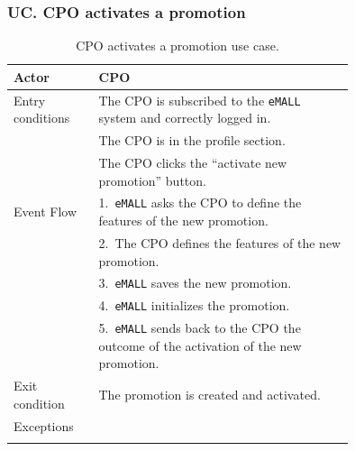\subsubsection*{UC\cuc . CPO activates a promotion}
\begin{center}
    \begin{longtable}{lp{0.75\linewidth}}
        \hline
        Actor            & CPO                                                                                        \\
        \hline
        Entry conditions & The CPO is subscribed to the \verb|eMALL| system and correctly logged in.                  \\
        & The CPO is in the profile section.                                                         \\
        & The CPO clicks the “activate new promotion” button.                                        \\
        \hline
        Event Flow       & 1.\ \verb|eMALL| asks the CPO to define the features of the new promotion.                 \\
        & 2.\ The CPO defines the features of the new promotion.                                     \\
        & 3.\ \verb|eMALL| saves the new promotion.                                                  \\
        & 4.\ \verb|eMALL| initializes the promotion.                                                \\
        & 5.\ \verb|eMALL| sends back to the CPO the outcome of the activation of the new promotion. \\
        \hline
        Exit condition   & The promotion is created and activated.                                                    \\
        \hline
        Exceptions       &                                                                                            \\
        \hline
        \caption{CPO activates a promotion use case.}
        \label{tab: CPO_activates_promotion_use_case}
    \end{longtable}


\end{center}
